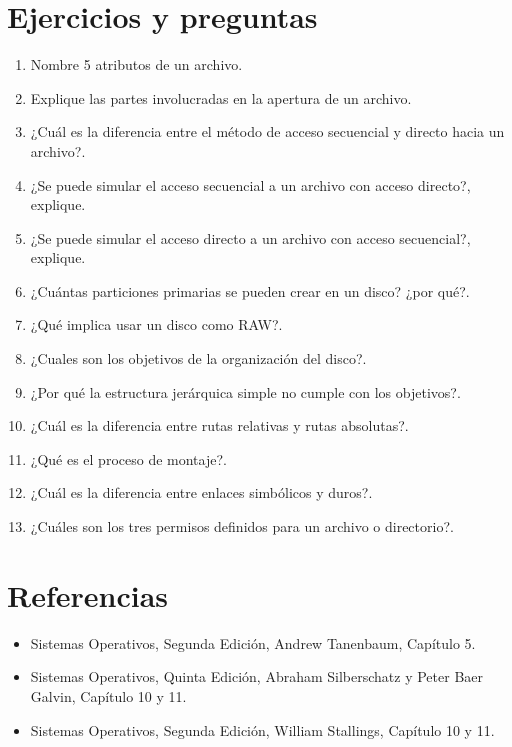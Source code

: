 \section{Ejercicios y preguntas}
\begin{enumerate}
	\item Nombre 5 atributos de un archivo.
	\item Explique las partes involucradas en la apertura de un archivo.
	\item ¿Cuál es la diferencia entre el método de acceso secuencial y directo hacia un archivo?.
	\item ¿Se puede simular el acceso secuencial a un archivo con acceso directo?, explique.
	\item ¿Se puede simular el acceso directo a un archivo con acceso secuencial?, explique.
	\item ¿Cuántas particiones primarias se pueden crear en un disco? ¿por qué?.
	\item ¿Qué implica usar un disco como RAW?.
	\item ¿Cuales son los objetivos de la organización del disco?.
	\item ¿Por qué la estructura jerárquica simple no cumple con los objetivos?.
	\item ¿Cuál es la diferencia entre rutas relativas y rutas absolutas?.
	\item ¿Qué es el proceso de montaje?.
	\item ¿Cuál es la diferencia entre enlaces simbólicos y duros?.
	\item ¿Cuáles son los tres permisos definidos para un archivo o directorio?.
\end{enumerate}

\section{Referencias}
\begin{itemize}
	\item Sistemas Operativos, Segunda Edición, Andrew Tanenbaum, Capítulo 5.
	\item Sistemas Operativos, Quinta Edición, Abraham Silberschatz y Peter Baer Galvin, Capítulo 10 y 11.
	\item Sistemas Operativos, Segunda Edición, William Stallings, Capítulo 10 y 11.
\end{itemize}
